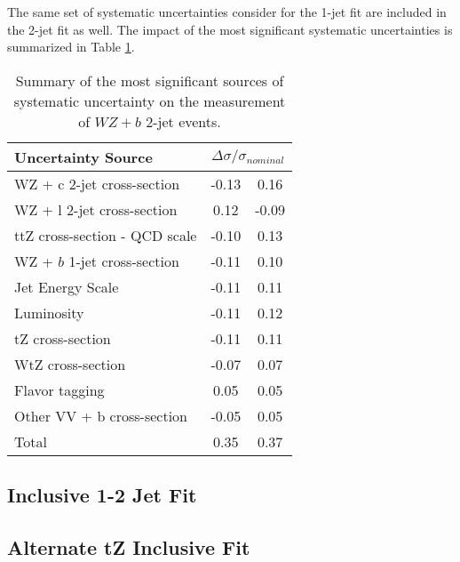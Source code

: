 
The same set of systematic uncertainties consider for the 1-jet fit are included in the 2-jet fit as well. The impact of the most significant systematic uncertainties is summarized in Table \ref{tab:systematics_2j}. 

\begin{table}[H]
    \centering
    \begin{tabular}{l|cc}
        \hline\hline
        Uncertainty Source & \multicolumn{2}{c}{$\Delta \sigma/\sigma_{nominal}$ }  \\
        \hline
        WZ + c 2-jet cross-section & -0.13 & 0.16 \\
        WZ + l 2-jet cross-section & 0.12 & -0.09 \\
        ttZ cross-section - QCD scale & -0.10 & 0.13 \\
        WZ + $b$ 1-jet cross-section & -0.11 & 0.10 \\
        Jet Energy Scale & -0.11 & 0.11 \\
        Luminosity & -0.11 & 0.12 \\
        tZ cross-section & -0.11 & 0.11 \\
        WtZ cross-section & -0.07 & 0.07 \\
        Flavor tagging  & 0.05 & 0.05 \\
        Other VV + b cross-section & -0.05 & 0.05 \\
        \hline
        Total & 0.35 & 0.37 \\
        \hline\hline
    \end{tabular}
    \caption{Summary of the most significant sources of systematic uncertainty on the measurement of $WZ+b$ 2-jet events.}
    \label{tab:systematics_2j}
\end{table}

\subsection{Inclusive 1-2 Jet Fit}
\label{sec:incFit}


\subsection{Alternate tZ Inclusive Fit}
\label{sec:inc_tZ}


